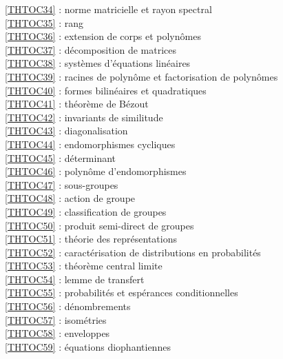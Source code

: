 \ref {THTOC34} : norme matricielle et rayon spectral\\
\ref {THTOC35} : rang\\
\ref {THTOC36} : extension de corps et polynômes\\
\ref {THTOC37} : décomposition de matrices\\
\ref {THTOC38} : systèmes d'équations linéaires\\
\ref {THTOC39} : racines de polynôme et factorisation de polynômes\\
\ref {THTOC40} : formes bilinéaires et quadratiques\\
\ref {THTOC41} : théorème de Bézout\\
\ref {THTOC42} : invariants de similitude\\
\ref {THTOC43} : diagonalisation\\
\ref {THTOC44} : endomorphismes cycliques\\
\ref {THTOC45} : déterminant\\
\ref {THTOC46} : polynôme d'endomorphismes\\
\ref {THTOC47} : sous-groupes\\
\ref {THTOC48} : action de groupe\\
\ref {THTOC49} : classification de groupes\\
\ref {THTOC50} : produit semi-direct de groupes\\
\ref {THTOC51} : théorie des représentations\\
\ref {THTOC52} : caractérisation de distributions en probabilités\\
\ref {THTOC53} : théorème central limite\\
\ref {THTOC54} : lemme de transfert\\
\ref {THTOC55} : probabilités et espérances conditionnelles\\
\ref {THTOC56} : dénombrements\\
\ref {THTOC57} : isométries\\
\ref {THTOC58} : enveloppes\\
\ref {THTOC59} : équations diophantiennes\\

